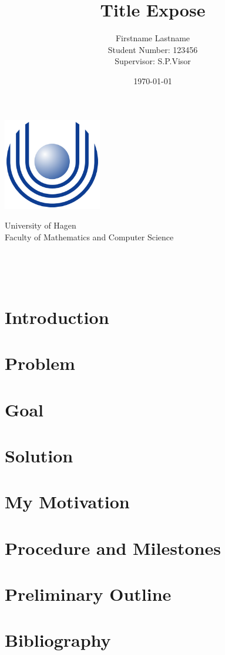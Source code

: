 \documentclass[letterpaper,oneside,11pt]{article}
\title{Title Expose}
\author{
    Firstname Lastname\\
    {\small Student Number: 123456}\\
    [1cm]{\small Supervisor: S.P.Visor}
}
\date{\today}
\begin{document}
  
  \begin{titlingpage} 
    \begin{center}
      \includegraphics[height=4cm]{images/Uni_hagen_logo}\\ %
      \begin{large}
        University of Hagen \\ 
        Faculty of Mathematics and Computer Science\\
      \end{large}
      
      \vspace{1.5in} 
      
      \begin{large} 
        \textbf{\thetitle} \\
      \end{large}
      \theauthor\\
      \vspace{2in} 
      \thedate
    \end{center}
  \end{titlingpage}

  \section{Introduction}

  \section{Problem}
    

  \section{Goal}

  \section{Solution}

  \section{My Motivation}
    

  \section{Procedure and Milestones}

  \section{Preliminary Outline}
    

  \section*{Bibliography}
\end{document}
